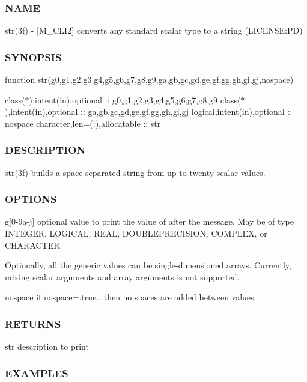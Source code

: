 \subsubsection*{N\+A\+ME}

str(3f) -\/ \mbox{[}M\+\_\+\+C\+L\+I2\mbox{]} converts any standard scalar type to a string (L\+I\+C\+E\+N\+SE\+:PD) \subsubsection*{S\+Y\+N\+O\+P\+S\+IS}

function str(g0,g1,g2,g3,g4,g5,g6,g7,g8,g9,ga,gb,gc,gd,ge,gf,gg,gh,gi,gj,nospace)

class($\ast$),intent(in),optional \+:\+: g0,g1,g2,g3,g4,g5,g6,g7,g8,g9 class($\ast$),intent(in),optional \+:\+: ga,gb,gc,gd,ge,gf,gg,gh,gi,gj logical,intent(in),optional \+:\+: nospace character,len=(\+:),allocatable \+:\+: str

\subsubsection*{D\+E\+S\+C\+R\+I\+P\+T\+I\+ON}

str(3f) builds a space-\/separated string from up to twenty scalar values.

\subsubsection*{O\+P\+T\+I\+O\+NS}

g\mbox{[}0-\/9a-\/j\mbox{]} optional value to print the value of after the message. May be of type I\+N\+T\+E\+G\+ER, L\+O\+G\+I\+C\+AL, R\+E\+AL, D\+O\+U\+B\+L\+E\+P\+R\+E\+C\+I\+S\+I\+ON, C\+O\+M\+P\+L\+EX, or C\+H\+A\+R\+A\+C\+T\+ER.

Optionally, all the generic values can be single-\/dimensioned arrays. Currently, mixing scalar arguments and array arguments is not supported.

nospace if nospace=.true., then no spaces are added between values \subsubsection*{R\+E\+T\+U\+R\+NS}

str description to print \subsubsection*{E\+X\+A\+M\+P\+L\+ES}

